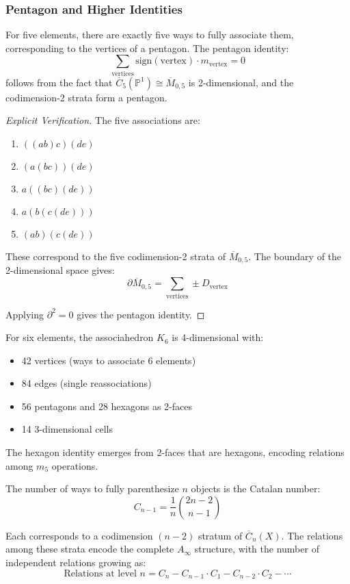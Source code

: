 \subsubsection{Pentagon and Higher Identities}

\begin{theorem}
For five elements, there are exactly five ways to fully associate them, corresponding to the vertices of a pentagon. The pentagon identity:
$$\sum_{\text{vertices}} \text{sign}(\text{vertex}) \cdot m_{\text{vertex}} = 0$$
follows from the fact that $\overline{C}_5(\mathbb{P}^1) \cong \overline{M}_{0,5}$ is 2-dimensional, and the codimension-2 strata form a pentagon.
\end{theorem}

\begin{proof}[Explicit Verification]
The five associations are:
\begin{enumerate}
\item $((ab)c)(de)$
\item $(a(bc))(de)$  
\item $a((bc)(de))$
\item $a(b(c(de)))$
\item $(ab)(c(de))$
\end{enumerate}

These correspond to the five codimension-2 strata of $\overline{M}_{0,5}$. The boundary of the 2-dimensional space gives:
$$\partial \overline{M}_{0,5} = \sum_{\text{vertices}} \pm D_{\text{vertex}}$$

Applying $\partial^2 = 0$ gives the pentagon identity.
\end{proof}

\begin{theorem}
For six elements, the associahedron $K_6$ is 4-dimensional with:
\begin{itemize}
\item 42 vertices (ways to associate 6 elements)
\item 84 edges (single reassociations)
\item 56 pentagons and 28 hexagons as 2-faces
\item 14 3-dimensional cells
\end{itemize}

The hexagon identity emerges from 2-faces that are hexagons, encoding relations among $m_5$ operations.
\end{theorem}

\begin{theorem}
The number of ways to fully parenthesize $n$ objects is the Catalan number:
$$C_{n-1} = \frac{1}{n}\binom{2n-2}{n-1}$$

Each corresponds to a codimension $(n-2)$ stratum of $\overline{C}_n(X)$. The relations among these strata encode the complete $A_\infty$ structure, with the number of independent relations growing as:
$$\text{Relations at level } n = C_n - C_{n-1} \cdot C_1 - C_{n-2} \cdot C_2 - \cdots$$
\end{theorem}

